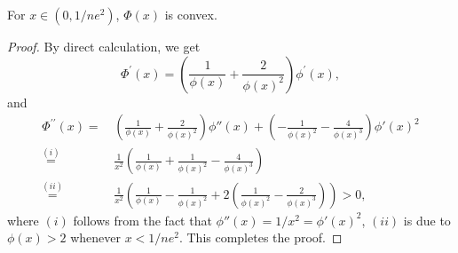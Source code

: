 \begin{lemma}
\label{lem: Convexity of Phi}
For $x \in (0, 1/ne^2)$, $\Phi (x)$ is convex. 
\end{lemma}

\begin{proof}

    By direct calculation, we get
    \begin{equation*}
        \Phi^\prime  (x) = \left( \frac{1}{\phi(x)} + \frac{2}{\phi(x)^2} \right) \phi^\prime (x),
    \end{equation*}
    and
    \begin{align*}
        \Phi^{\prime \prime}  (x) = \, & \left( \frac{1}{\phi(x)} + \frac{2}{\phi(x)^2}  \right) \phi''(x) + \left( - \frac{1}{\phi(x)^2} - \frac{4}{\phi(x)^3} \right) \phi'(x)^2 \\
        \stackrel{(i)}{=} \, & \frac{1}{x^2} \left( \frac{1}{\phi(x)} + \frac{1}{\phi(x)^2} - \frac{4}{\phi(x)^3} \right) \\
        \stackrel{(ii)}{=} \, & \frac{1}{x^2} \left( \frac{1}{\phi(x)} - \frac{1}{\phi(x)^2} + 2 \left( \frac{1}{\phi(x)^2} - \frac{2}{\phi(x)^3} \right)  \right)  > 0,
    \end{align*}
    where $(i)$ follows from the fact that $\phi''(x) = 1/x^2 = \phi'(x)^2$, $(ii)$ is due to $\phi(x) > 2$ whenever $x < 1/ne^2$. This completes the proof.
\end{proof}

